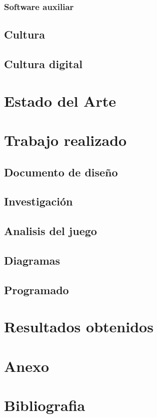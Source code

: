 \documentclass[11pt,letterpaper]{article}
\begin{document}
			\subsubsection{Software auxiliar}
		\subsection{Cultura}
		\subsection{Cultura digital}		
	\section{Estado del Arte}
	\section{Trabajo realizado}
		\subsection{Documento de diseño}
		\subsection{Investigación}		
		\subsection{Analisis del juego}
		\subsection{Diagramas}
		\subsection{Programado}
	\section{Resultados obtenidos}
	\section{Anexo}	
	\section{Bibliografia}
	
	
\end{document}
